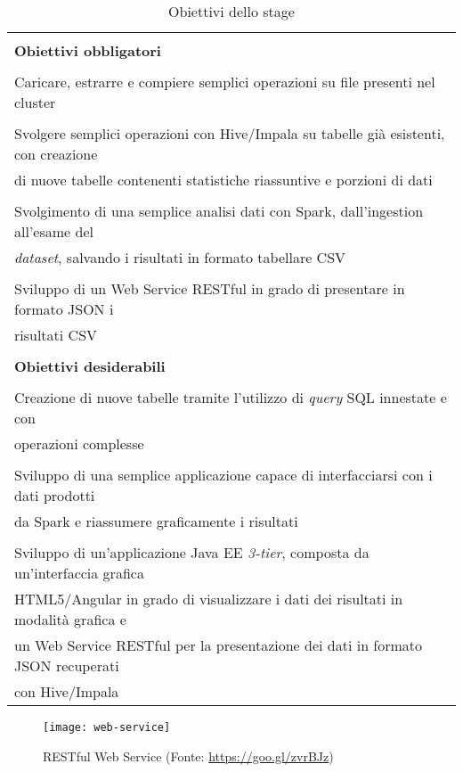 \begin{table}[!h] %
	\caption{Obiettivi dello stage} \label{obiettivi_stage}
	\label{tab:obiettivi-stage}
	\begin{tabular}{|l|}
		\hline
		\\[-2mm]
		\textbf{Obiettivi obbligatori}\\
		\hline
		\\[-2mm]
		Caricare, estrarre e compiere semplici operazioni su file presenti nel \gls{cluster}	\\
		\hline
		\\[-2mm]
		Svolgere semplici operazioni con Hive/Impala su tabelle già esistenti, con creazione \\ di nuove tabelle contenenti statistiche riassuntive e porzioni di dati	\\
		\hline
		\\[-2mm]
		Svolgimento di una semplice analisi dati con Spark, dall'ingestion all'esame del \\ \textit{dataset}, salvando i risultati in formato tabellare CSV	\\
		\hline
		\\[-2mm]
		Sviluppo di un \gls{Web Service} RESTful in grado di presentare in formato JSON i \\ risultati CSV \\
		\hline
		\hline
		\\[-2mm]
		\textbf{Obiettivi desiderabili}\\
		\hline
		\\[-2mm]
		Creazione di nuove tabelle tramite l'utilizzo di \textit{query} SQL innestate e con \\ operazioni complesse \\
		\hline
		\\[-2mm]
		Sviluppo di una semplice applicazione capace di interfacciarsi con i dati prodotti \\ da Spark e riassumere graficamente i risultati \\
		\hline
		\\[-2mm]
		Sviluppo di un'applicazione Java EE \textit{3-tier}, composta da un'interfaccia grafica \\ HTML5/Angular in grado di visualizzare i dati dei risultati in modalità grafica e \\ un Web Service RESTful per la presentazione dei dati in formato JSON recuperati \\ con Hive/Impala \\
		\hline
	\end{tabular}
\end{table}%
\clearpage
\begin{figure}[!h] 
	\centering 
	\texttt{[image: web-service]}
	\caption{RESTful Web Service (Fonte: \href{https://goo.gl/zvrBJz}{https://goo.gl/zvrBJz})}
\end{figure}

